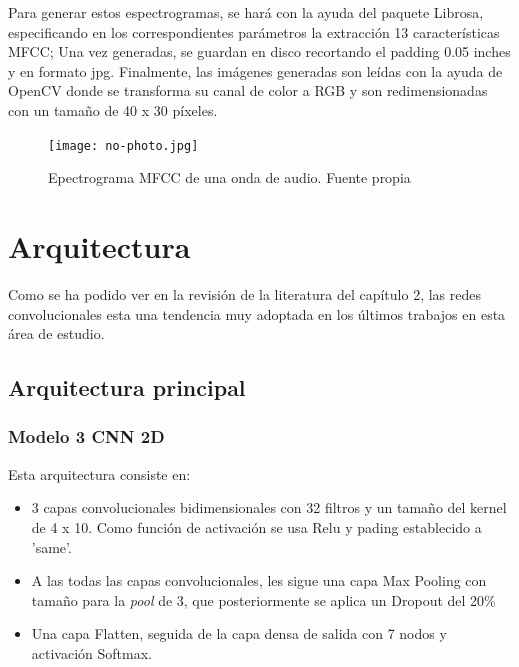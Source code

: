 \documentclass[11pt,a4paper,spanish]{book}
\begin{document}
	Para generar estos espectrogramas, se hará con la ayuda del paquete Librosa, especificando en los correspondientes parámetros la extracción 13 características MFCC; Una vez generadas, se guardan en disco recortando el padding 0.05 inches y en formato jpg.
	Finalmente, las imágenes generadas son leídas con la ayuda de OpenCV donde se transforma su canal de color a RGB y son redimensionadas con un tamaño de 40 x 30 píxeles.
	
	\begin{figure}[H]
		\centering
		\texttt{[image: no-photo.jpg]} 
		\caption{Epectrograma MFCC de una onda de audio. Fuente propia}
		\label{fig:mfcc_sample}
	\end{figure}
	
	
	\section{Arquitectura}
	\label{sec:arquitectura_cap4}
	Como se ha podido ver en la revisión de la literatura del capítulo 2, las redes convolucionales esta una tendencia muy adoptada en los últimos trabajos en esta área de estudio.
	
	
	\subsection{Arquitectura principal}
		\subsubsection{Modelo 3 CNN 2D}
		Esta arquitectura consiste en:
		\begin{itemize}
			\item 3 capas convolucionales bidimensionales con 32 filtros y un tamaño del kernel de 4 x 10. Como función de activación se usa Relu y pading establecido a 'same'.
			
			\item A las todas las capas convolucionales, les sigue una capa Max Pooling con tamaño para la \emph{pool} de 3, que posteriormente se aplica un Dropout del 20\%
			
			\item Una capa Flatten, seguida de la capa densa de salida con 7 nodos y activación Softmax.
		\end{itemize}
		
\end{document}

